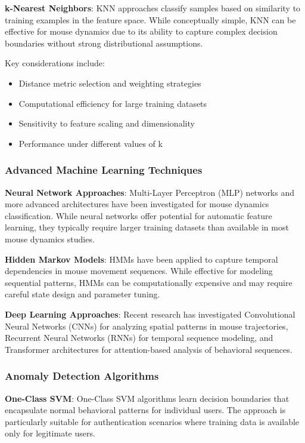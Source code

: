 \documentclass[
  12pt,
  a4paper,
]{report}
\providecommand{\tightlist}{%
  \setlength{\itemsep}{0pt}\setlength{\parskip}{0pt}}
\begin{document}
\textbf{k-Nearest Neighbors}: KNN approaches classify samples based on
similarity to training examples in the feature space. While conceptually
simple, KNN can be effective for mouse dynamics due to its ability to
capture complex decision boundaries without strong distributional
assumptions.

Key considerations include:

\begin{itemize}
\tightlist
\item
  Distance metric selection and weighting strategies
\item
  Computational efficiency for large training datasets
\item
  Sensitivity to feature scaling and dimensionality
\item
  Performance under different values of k
\end{itemize}

\subsubsection{Advanced Machine Learning
Techniques}\label{advanced-machine-learning-techniques}

\textbf{Neural Network Approaches}: Multi-Layer Perceptron (MLP)
networks and more advanced architectures have been investigated for
mouse dynamics classification. While neural networks offer potential for
automatic feature learning, they typically require larger training
datasets than available in most mouse dynamics studies.

\textbf{Hidden Markov Models}: HMMs have been applied to capture
temporal dependencies in mouse movement sequences. While effective for
modeling sequential patterns, HMMs can be computationally expensive and
may require careful state design and parameter tuning.

\textbf{Deep Learning Approaches}: Recent research has investigated
Convolutional Neural Networks (CNNs) for analyzing spatial patterns in
mouse trajectories, Recurrent Neural Networks (RNNs) for temporal
sequence modeling, and Transformer architectures for attention-based
analysis of behavioral sequences.

\subsubsection{Anomaly Detection
Algorithms}\label{anomaly-detection-algorithms}

\textbf{One-Class SVM}: One-Class SVM algorithms learn decision
boundaries that encapsulate normal behavioral patterns for individual
users. The approach is particularly suitable for authentication
scenarios where training data is available only for legitimate users.
\end{document}
